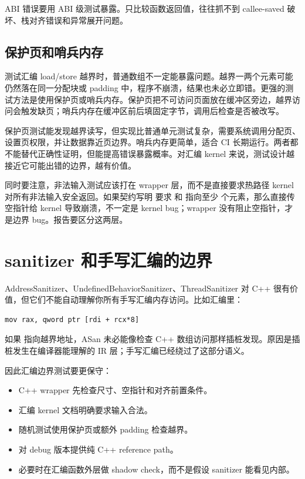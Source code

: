 \begin{keyidea}
ABI 错误要用 ABI 级测试暴露。只比较函数返回值，往往抓不到 callee-saved 破坏、栈对齐错误和异常展开问题。
\end{keyidea}

\subsection{保护页和哨兵内存}

测试汇编 load/store 越界时，普通数组不一定能暴露问题。越界一两个元素可能仍然落在同一分配块或 padding 中，程序不崩溃，结果也未必立即错。更强的测试方法是使用保护页或哨兵内存。保护页把不可访问页面放在缓冲区旁边，越界访问会触发缺页；哨兵内存在缓冲区前后填固定字节，调用后检查是否被改写。

保护页测试能发现越界读写，但实现比普通单元测试复杂，需要系统调用分配页、设置页权限，并让数据靠近页边界。哨兵内存更简单，适合 CI 长期运行。两者都不能替代正确性证明，但能提高错误暴露概率。对汇编 kernel 来说，测试设计越接近它可能出错的边界，越有价值。

同时要注意，非法输入测试应该打在 wrapper 层，而不是直接要求热路径 kernel 对所有非法输入安全返回。如果契约写明  要求  和  指向至少  个元素，那么直接传空指针给 kernel 导致崩溃，不一定是 kernel bug；wrapper 没有阻止空指针，才是边界 bug。报告要区分这两层。

\section{sanitizer 和手写汇编的边界}

AddressSanitizer、UndefinedBehaviorSanitizer、ThreadSanitizer 对 C++ 很有价值，但它们不能自动理解你所有手写汇编内存访问。比如汇编里：

\begin{lstlisting}
mov rax, qword ptr [rdi + rcx*8]
\end{lstlisting}

如果  指向越界地址，ASan 未必能像检查 C++ 数组访问那样插桩发现。原因是插桩发生在编译器能理解的 IR 层；手写汇编已经绕过了这部分语义。

因此汇编边界测试要更保守：

\begin{itemize}
  \item C++ wrapper 先检查尺寸、空指针和对齐前置条件。
  \item 汇编 kernel 文档明确要求输入合法。
  \item 随机测试使用保护页或额外 padding 检查越界。
  \item 对 debug 版本提供纯 C++ reference path。
  \item 必要时在汇编函数外层做 shadow check，而不是假设 sanitizer 能看见内部。
\end{itemize}

